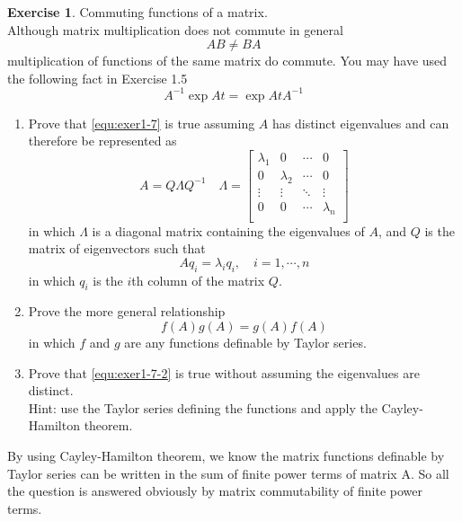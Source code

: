 \documentclass[11pt,a4paper]{report}
\theoremstyle{definition}\newtheorem{exercise}{Exercise}[chapter]
\begin{document}
\begin{exercise}Commuting functions of a matrix.\\
Although matrix multiplication does not commute in general
\begin{equation}
    AB\neq BA
\end{equation}
multiplication of functions of the same matrix do commute. You may have used the following fact in Exercise 1.5
\begin{equation}\label{equ:exer1-7}
    A^{-1}\exp{At}=\exp{At}A^{-1}
\end{equation}
\begin{enumerate}[label=(\alph*)]
    \item Prove that \eqref{equ:exer1-7} is true assuming $A$ has distinct eigenvalues and can therefore be represented as 
    \begin{equation}
        A=Q\Lambda Q^{-1}\quad 
        \Lambda=\begin{bmatrix}
            \lambda_1 &0 &\cdots &0\\
            0 &\lambda_2 &\cdots &0\\
            \vdots &\vdots &\ddots &\vdots\\
            0 &0 &\cdots &\lambda_n\\
        \end{bmatrix}
    \end{equation}
    in which $\Lambda$ is a diagonal matrix containing the eigenvalues of $A$, and $Q$ is the matrix of eigenvectors such that
    \begin{equation}
        Aq_i=\lambda_iq_i, \quad i=1,\cdots,n
    \end{equation}
    in which $q_i$ is the $i$th column of the matrix $Q$.
    \item Prove the more general relationship
    \begin{equation}\label{equ:exer1-7-2}
        f(A)g(A)=g(A)f(A)
    \end{equation}
    in which $f$ and $g$ are any functions definable by Taylor series.
    \item Prove that \eqref{equ:exer1-7-2} is true without assuming the eigenvalues are distinct.\\
    Hint: use the Taylor series defining the functions and apply the Cayley-Hamilton theorem\cite{rawlings2017model}.
\end{enumerate}
\end{exercise}

\begin{answer}
By using Cayley-Hamilton theorem, we know the matrix functions definable by Taylor series can be written in the sum of finite power terms of matrix A\cite{CayleyHamiltonTheorem}. So all the question is answered obviously by matrix commutability of finite power terms.
\end{answer}
\end{document}
